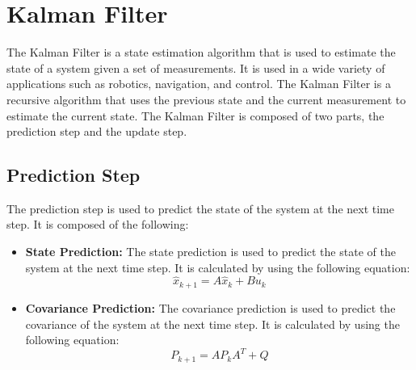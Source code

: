 \documentclass[12pt]{article}
\numberwithin{equation}{section}
\begin{document}
\section{Kalman Filter}
The Kalman Filter is a state estimation algorithm that is used to estimate the state of a system given a set of measurements. It is used in a wide variety of applications such as robotics, navigation, and control. The Kalman Filter is a recursive algorithm that uses the previous state and the current measurement to estimate the current state. The Kalman Filter is composed of two parts, the prediction step and the update step.\cite{Kim2011Kalman} 
\subsection{Prediction Step}
The prediction step is used to predict the state of the system at the next time step. It is composed of the following:
\begin{itemize}
  \item \textbf{State Prediction:} The state prediction is used to predict the state of the system at the next time step. It is calculated by using the following equation:
    \begin{equation}
      \hat{x}_{k+1} = A\hat{x}_k + B u_k
    \end{equation}
  \item \textbf{Covariance Prediction:} The covariance prediction is used to predict the covariance of the system at the next time step. It is calculated by using the following equation:
    \begin{equation}
      P_{k+1} = A P_k A^T + Q
    \end{equation}
\end{itemize}
\end{document}
